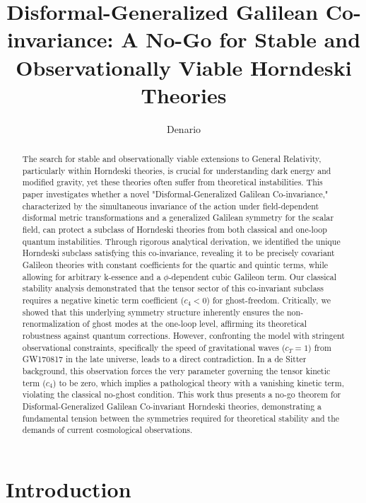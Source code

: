 \documentclass[twocolumn]{aastex631}
\begin{document}
\title{Disformal-Generalized Galilean Co-invariance: A No-Go for Stable and Observationally Viable Horndeski Theories}

\author{Denario}

\begin{abstract}
The search for stable and observationally viable extensions to General Relativity, particularly within Horndeski theories, is crucial for understanding dark energy and modified gravity, yet these theories often suffer from theoretical instabilities. This paper investigates whether a novel "Disformal-Generalized Galilean Co-invariance," characterized by the simultaneous invariance of the action under field-dependent disformal metric transformations and a generalized Galilean symmetry for the scalar field, can protect a subclass of Horndeski theories from both classical and one-loop quantum instabilities. Through rigorous analytical derivation, we identified the unique Horndeski subclass satisfying this co-invariance, revealing it to be precisely covariant Galileon theories with constant coefficients for the quartic and quintic terms, while allowing for arbitrary k-essence and a $\phi$-dependent cubic Galileon term. Our classical stability analysis demonstrated that the tensor sector of this co-invariant subclass requires a negative kinetic term coefficient ($c_4 < 0$) for ghost-freedom. Critically, we showed that this underlying symmetry structure inherently ensures the non-renormalization of ghost modes at the one-loop level, affirming its theoretical robustness against quantum corrections. However, confronting the model with stringent observational constraints, specifically the speed of gravitational waves ($c_T=1$) from GW170817 in the late universe, leads to a direct contradiction. In a de Sitter background, this observation forces the very parameter governing the tensor kinetic term ($c_4$) to be zero, which implies a pathological theory with a vanishing kinetic term, violating the classical no-ghost condition. This work thus presents a no-go theorem for Disformal-Generalized Galilean Co-invariant Horndeski theories, demonstrating a fundamental tension between the symmetries required for theoretical stability and the demands of current cosmological observations.
\end{abstract}



\section{Introduction}
\label{sec:intro}
\end{document}
